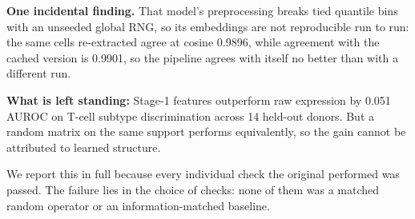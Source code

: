 \textbf{One incidental finding.} That model's preprocessing breaks tied quantile bins with an unseeded global
RNG, so its embeddings are not reproducible run to run: the same cells re-extracted agree at cosine
0.9896, while agreement with the cached version is 0.9901, so the pipeline agrees with itself no better
than with a different run.

\textbf{What is left standing:} Stage-1 features outperform raw expression by 0.051 AUROC on T-cell subtype
discrimination across 14 held-out donors. But a random matrix on the same support performs
equivalently, so the gain cannot be attributed to learned structure.

We report this in full because every individual check the original performed was passed. The failure
lies in the choice of checks: none of them was a matched random operator or an information-matched
baseline.
